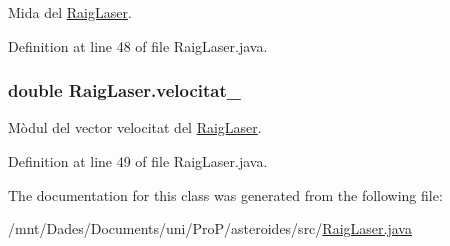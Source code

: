 Mida del \hyperlink{class_raig_laser}{Raig\+Laser}. 



Definition at line 48 of file Raig\+Laser.\+java.

\hypertarget{class_raig_laser_af4bf8a2a716caaa467e7a01ca1566924}{}
\subsubsection[{velocitat\+\_\+}]{\setlength{\rightskip}{0pt plus 5cm}double Raig\+Laser.\+velocitat\+\_\+\hspace{0.3cm}{\ttfamily [private]}}\label{class_raig_laser_af4bf8a2a716caaa467e7a01ca1566924}


Mòdul del vector velocitat del \hyperlink{class_raig_laser}{Raig\+Laser}. 



Definition at line 49 of file Raig\+Laser.\+java.



The documentation for this class was generated from the following file\+:\begin{DoxyCompactItemize}
\item 
/mnt/\+Dades/\+Documents/uni/\+Pro\+P/asteroides/src/\hyperlink{_raig_laser_8java}{Raig\+Laser.\+java}\end{DoxyCompactItemize}
